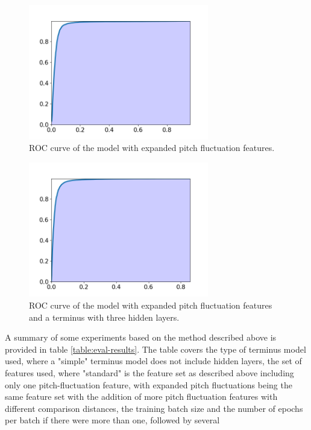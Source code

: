 \documentclass{article}
\begin{document}
		\begin{figure}[htbp]
			\centering
			\includegraphics[width=0.7\textwidth]{images/roc_mpf.png}
			\caption{ROC curve of the model with expanded pitch fluctuation features.}
			\label{fig:roc_mpf}
		\end{figure}
		\begin{figure}[htbp]
			\centering
			\includegraphics[width=0.7\textwidth]{images/roc_mpf_cterm.png}
			\caption{ROC curve of the model with expanded pitch fluctuation features and a
			terminus with three hidden layers.}
			\label{fig:roc_mpf_cterm}
		\end{figure}
		\sloppy
		A summary of some experiments based on the method described above is provided in table
		\ref{table:eval-results}. The table covers the type of terminus model used, where a
		"simple" terminus model does not include hidden layers, the set of features used, where
		"standard" is the feature set as described above including only one pitch-fluctuation
		feature, with expanded pitch fluctuations being the same feature set with the addition of
		more pitch fluctuation features with different comparison distances, the training batch
		size and the number of epochs per batch if there were more than one, followed by several
\end{document}
